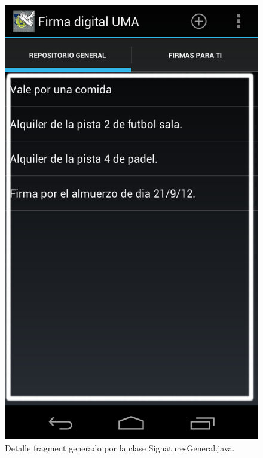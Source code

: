 \begin{itemize}

\begin{figure}[h]
  \centering
    \includegraphics[scale=0.2]{./Android/imagenes/signaturesGeneral.png}
  \caption{Detalle fragment generado por la clase SignaturesGeneral.java.}
  \label{fig:signaturesGeneral}
\end{figure}



\end{itemize}
